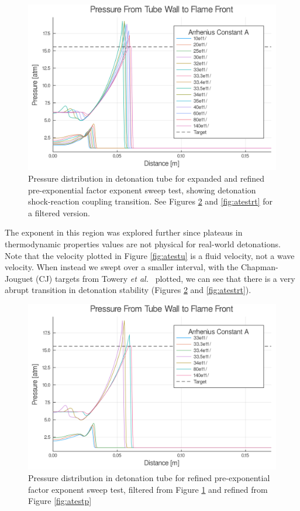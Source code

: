\begin{figure}
\centering
\includegraphics[width=0.85\linewidth]{./figs/Atest_refined/p_large.png}
\caption{Pressure distribution in detonation tube for expanded and refined pre-exponential factor exponent sweep test, showing detonation shock-reaction coupling transition. See Figures \ref{fig:atestrp} and \ref{fig:atestrt} for a filtered version.}
\label{fig:pjump}
\end{figure}


The exponent in this region was explored further since plateaus in thermodynamic properties values are not physical for real-world detonations. Note that the velocity plotted in Figure \ref{fig:atestu} is a fluid velocity, not a wave velocity. When instead we swept over a smaller interval, with the Chapman-Jouguet (CJ) targets from Towery \textit{et al.}~\cite{towery1} plotted, we can see that there is a very abrupt transition in detonation stability (Figures \ref{fig:atestrp} and \ref{fig:atestrt}). 

\begin{figure}
\centering
\includegraphics[width=0.85\linewidth]{./figs/Atest_refined/p.png}
\caption{Pressure distribution in detonation tube for refined pre-exponential factor exponent sweep test, filtered from Figure \ref{fig:pjump} and refined from Figure \ref{fig:atestp}}
\label{fig:atestrp}
\end{figure}

